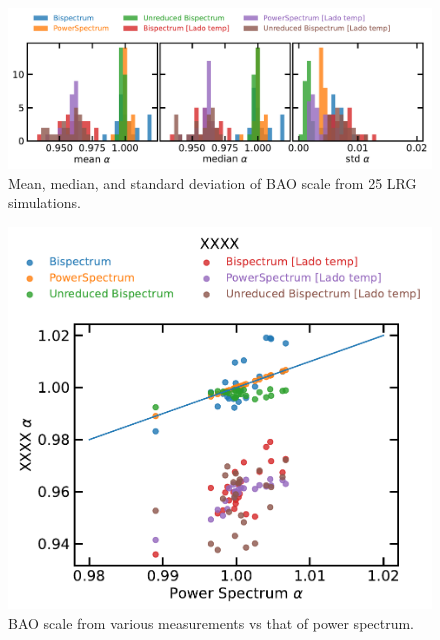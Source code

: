 \begin{figure}
    \centering
    \includegraphics[width=\textwidth]{figures/constraints.pdf}
    \caption{Mean, median, and standard deviation of BAO scale from 25 LRG simulations.}
    \label{fig:constraints}
\end{figure}


\begin{figure}
    \centering
    \includegraphics[width=0.45 \textwidth]{figures/constraints_scatter.pdf}
    \caption{BAO scale from various measurements vs that of power spectrum.}
    \label{fig:scatter_cons}
\end{figure}